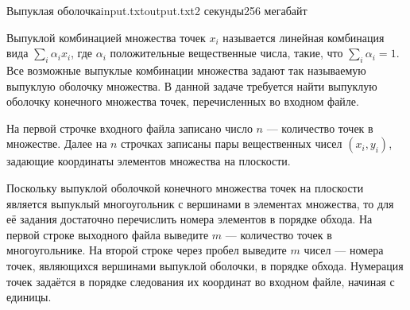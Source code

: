 \begin{problem}{Выпуклая оболочка}{input.txt}{output.txt}{2 секунды}{256 мегабайт}

Выпуклой комбинацией множества точек $x_i$ называется линейная комбинация вида $\sum\limits_i \alpha_i x_i$, где $\alpha_i$ положительные вещественные числа, такие, что $\sum\limits_i \alpha_i = 1$. Все возможные выпуклые комбинации множества задают так называемую выпуклую оболочку множества. В данной задаче требуется найти выпуклую оболочку конечного множества точек, перечисленных во входном файле.

\InputFile

На первой строчке входного файла записано число $n$ — количество точек в множестве. Далее на $n$ строчках записаны пары вещественных чисел $(x_i, y_i)$, задающие координаты элементов множества на плоскости.

\OutputFile

Поскольку выпуклой оболочкой конечного множества точек на плоскости является выпуклый многоугольник с вершинами в элементах множества, то для её задания достаточно перечислить номера элементов в порядке обхода. На первой строке выходного файла выведите $m$ — количество точек в многоугольнике. На второй строке через пробел выведите $m$ чисел — номера точек, являющихся вершинами выпуклой оболочки, в порядке обхода. Нумерация точек задаётся в порядке следования их координат во входном файле, начиная с единицы.

\Examples

\begin{example}%
%
\end{example}

\end{problem}

